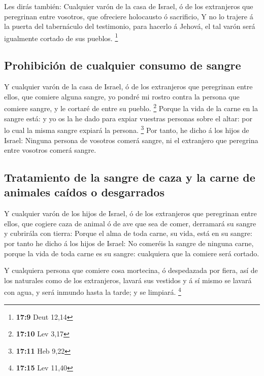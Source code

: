  Les dirás también: Cualquier varón de la casa de Israel, ó
de los extranjeros que peregrinan entre vosotros, que ofreciere
holocausto ó sacrificio,  Y no lo trajere á la puerta del
tabernáculo del testimonio, para hacerlo á Jehová, el tal varón será
igualmente cortado de sus pueblos. \footnote{\textbf{17:9} Deut 12,14}

\hypertarget{prohibiciuxf3n-de-cualquier-consumo-de-sangre}{%
\subsection{Prohibición de cualquier consumo de
sangre}\label{prohibiciuxf3n-de-cualquier-consumo-de-sangre}}

 Y cualquier varón de la casa de Israel, ó de los
extranjeros que peregrinan entre ellos, que comiere alguna sangre, yo
pondré mi rostro contra la persona que comiere sangre, y le cortaré de
entre su pueblo. \footnote{\textbf{17:10} Lev 3,17}  Porque
la vida de la carne en la sangre está: y yo os la he dado para expiar
vuestras personas sobre el altar: por lo cual la misma sangre expiará la
persona. \footnote{\textbf{17:11} Heb 9,22}  Por tanto, he
dicho á los hijos de Israel: Ninguna persona de vosotros comerá sangre,
ni el extranjero que peregrina entre vosotros comerá sangre.

\hypertarget{tratamiento-de-la-sangre-de-caza-y-la-carne-de-animales-cauxeddos-o-desgarrados}{%
\subsection{Tratamiento de la sangre de caza y la carne de animales
caídos o
desgarrados}\label{tratamiento-de-la-sangre-de-caza-y-la-carne-de-animales-cauxeddos-o-desgarrados}}

 Y cualquier varón de los hijos de Israel, ó de los
extranjeros que peregrinan entre ellos, que cogiere caza de animal ó de
ave que sea de comer, derramará su sangre y cubrirála con tierra:
 Porque el alma de toda carne, su vida, está en su sangre:
por tanto he dicho á los hijos de Israel: No comeréis la sangre de
ninguna carne, porque la vida de toda carne es su sangre: cualquiera que
la comiere será cortado.

 Y cualquiera persona que comiere cosa mortecina, ó
despedazada por fiera, así de los naturales como de los extranjeros,
lavará sus vestidos y á sí mismo se lavará con agua, y será inmundo
hasta la tarde; y se limpiará. \footnote{\textbf{17:15} Lev 11,40}

